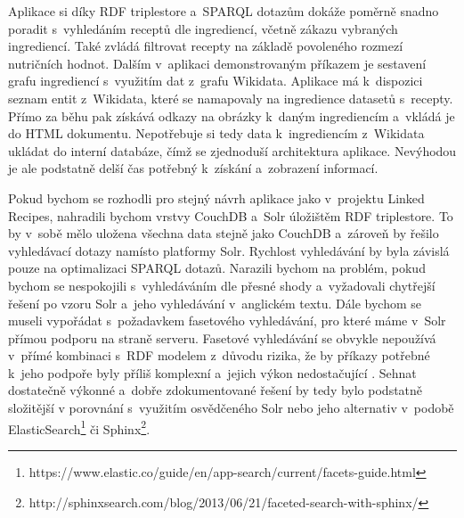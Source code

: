 Aplikace si díky RDF triplestore a~SPARQL dotazům dokáže poměrně snadno poradit s~vyhledáním receptů dle ingrediencí, včetně zákazu vybraných ingrediencí. Také zvládá filtrovat recepty na základě povoleného rozmezí nutričních hodnot. Dalším v~aplikaci demonstrovaným příkazem je sestavení grafu ingrediencí s~využitím dat z~grafu Wikidata. Aplikace má k~dispozici seznam entit z~Wikidata, které se namapovaly na ingredience datasetů s~recepty. Přímo za běhu pak získává odkazy na obrázky k~daným ingrediencím a~vkládá je do HTML dokumentu. Nepotřebuje si tedy data k~ingrediencím z~Wikidata ukládat do interní databáze, čímž se zjednoduší architektura aplikace. Nevýhodou je ale podstatně delší čas potřebný k~získání a~zobrazení informací.

Pokud bychom se rozhodli pro stejný návrh aplikace jako v~projektu Linked Recipes, nahradili bychom vrstvy CouchDB a~Solr úložištěm RDF triplestore. To by v~sobě mělo uložena všechna data stejně jako CouchDB a~zároveň by řešilo vyhledávací dotazy namísto platformy Solr. Rychlost vyhledávání by byla závislá pouze na optimalizaci SPARQL dotazů. Narazili bychom na problém, pokud bychom se nespokojili s~vyhledáváním dle přesné shody a~vyžadovali chytřejší řešení po vzoru Solr a~jeho vyhledávání v~anglickém textu. Dále bychom se museli vypořádat s~požadavkem fasetového vyhledávání, pro které máme v~Solr přímou podporu na straně serveru. Fasetové vyhledávání se obvykle nepoužívá v~přímé kombinaci s~RDF modelem z~důvodu rizika, že by příkazy potřebné k~jeho podpoře byly příliš komplexní a~jejich výkon nedostačující \citep{sparql-facet}. Sehnat dostatečně výkonné a~dobře zdokumentované řešení by tedy bylo podstatně složitější v porovnání s~využitím osvědčeného Solr nebo jeho alternativ v~podobě ElasticSearch\footnote{https://www.elastic.co/guide/en/app-search/current/facets-guide.html} či Sphinx\footnote{http://sphinxsearch.com/blog/2013/06/21/faceted-search-with-sphinx/}.
